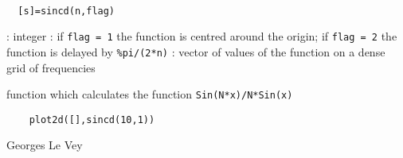 
\begin{mandesc}
   \\ %
\end{mandesc}
\begin{calling_sequence}
\begin{verbatim}
  [s]=sincd(n,flag)  
\end{verbatim}
\end{calling_sequence}
\begin{parameters}
  \begin{varlist}
    : integer
    : if \verb!flag = 1! the function is centred around the origin; if \verb!flag = 2! the function is delayed by \verb!%pi/(2*n)!
    : vector of values of the function on a dense grid of frequencies
  \end{varlist}
\end{parameters}
\begin{mandescription}
  function which calculates the function \verb!Sin(N*x)/N*Sin(x)!
\end{mandescription}
\begin{examples}
  \begin{Verbatim}
    plot2d([],sincd(10,1)) 
  \end{Verbatim}
\end{examples}
\begin{authors}
  Georges Le Vey  
\end{authors}

